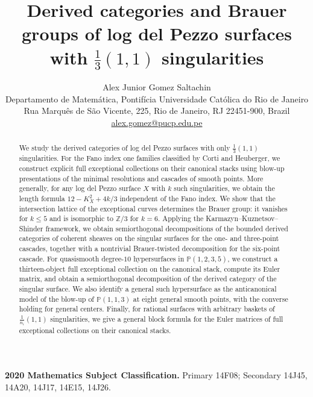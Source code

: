 \documentclass[11pt]{article}
\theoremstyle{plain}
\theoremstyle{definition}
\theoremstyle{remark}
\begin{document}
\title{Derived categories and Brauer groups of log del Pezzo surfaces with \texorpdfstring{$\frac13(1,1)$}{1/3(1,1)} singularities}
\author{Alex Junior Gomez Saltachin\\[0.5em]
\small Departamento de Matem\'atica, Pontif\'icia Universidade Cat\'olica do Rio de Janeiro\\
\small Rua Marqu\^es de S\~ao Vicente, 225, Rio de Janeiro, RJ 22451-900, Brazil\\
\small \href{mailto:alex.gomez@pucp.edu.pe}{alex.gomez@pucp.edu.pe}}
\date{}

\maketitle

\begin{abstract}
We study the derived categories of log del Pezzo surfaces with only $\tfrac13(1,1)$ singularities. For the Fano index one families classified by Corti and Heuberger, we construct explicit full exceptional collections on their canonical stacks using blow-up presentations of the minimal resolutions and cascades of smooth points. More generally, for any log del Pezzo surface $X$ with $k$ such singularities, we obtain the length formula $12-K_X^2+4k/3$ independent of the Fano index.
We show that the intersection lattice of the exceptional curves determines the Brauer group: it vanishes for $k\leq5$ and is isomorphic to $\mathbb Z/3$ for $k=6$. Applying the Karmazyn--Kuznetsov--Shinder framework, we obtain semiorthogonal decompositions of the bounded derived categories of coherent sheaves on the singular surfaces for the one- and three-point cascades, together with a nontrivial Brauer-twisted decomposition for the six-point cascade.
For quasismooth degree-$10$ hypersurfaces in $\mathbb P(1,2,3,5)$, we construct a thirteen-object full exceptional collection on the canonical stack, compute its Euler matrix, and obtain a semiorthogonal decomposition of the derived category of the singular surface. We also identify a general such hypersurface as the anticanonical model of the blow-up of $\mathbb P(1,1,3)$ at eight general smooth points, with the converse holding for general centers.
Finally, for rational surfaces with arbitrary baskets of $\tfrac1{n_i}(1,1)$ singularities, we give a general block formula for the Euler matrices of full exceptional collections on their canonical stacks.
\end{abstract}


\medskip
\noindent\textbf{2020 Mathematics Subject Classification.}
Primary 14F08; Secondary 14J45, 14A20, 14J17, 14E15, 14J26.
\end{document}
